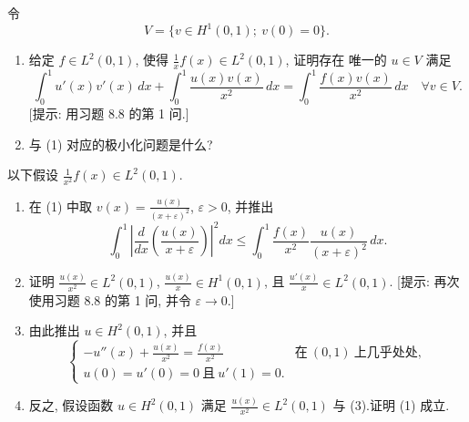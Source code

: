 \begin{exercise}
\label{exer:8.20}
令
\begin{equation*}
V=\{v\in H^1(0,1);\ v(0)=0\}.
\end{equation*}
\begin{enumerate}[label=\arabic*., leftmargin=2.2em, itemsep=0.3em]
	\item 给定 $f\in L^2(0,1)$, 使得 $\frac1xf(x)\in L^2(0,1)$, 证明存在
	      唯一的 $u\in V$ 满足
	      \begin{equation}
	      \int_0^1u'(x)v'(x)\,dx+\int_0^1\frac{u(x)v(x)}{x^2}\,dx
	      =\int_0^1\frac{f(x)v(x)}{x^2}\,dx\quad\forall v\in V.
	      \tag{1}
	      \end{equation}
	      [提示: 用习题 8.8 的第 1 问.]
	\item 与 (1) 对应的极小化问题是什么?
\end{enumerate}
以下假设 $\frac{1}{x^2}f(x)\in L^2(0,1)$.
\begin{enumerate}[label=\arabic*., leftmargin=2.2em, itemsep=0.3em, start=3]
	\item 在 (1) 中取 $v(x)=\frac{u(x)}{(x+\varepsilon)^2}$, $\varepsilon>0$,
	      并推出
	      \begin{equation}
	      \int_0^1\left|\frac{d}{dx}\left(\frac{u(x)}{x+\varepsilon}\right)
	      \right|^2dx\le\int_0^1\frac{f(x)}{x^2}\frac{u(x)}{(x+\varepsilon)^2}\,dx.
	      \tag{2}
	      \end{equation}
	\item 证明 $\frac{u(x)}{x^2}\in L^2(0,1)$,
	      $\frac{u(x)}{x}\in H^1(0,1)$, 且 $\frac{u'(x)}{x}\in L^2(0,1)$.
	      [提示: 再次使用习题 8.8 的第 1 问, 并令 $\varepsilon\to0$.]
	\item 由此推出 $u\in H^2(0,1)$, 并且
	      \begin{equation}
	      \begin{cases}
	      -u''(x)+\frac{u(x)}{x^2}=\frac{f(x)}{x^2} & \text{在}\ (0,1)\ \text{上几乎处处},\\
	      u(0)=u'(0)=0\ \text{且}\ u'(1)=0.
	      \end{cases}
	      \tag{3}
	      \end{equation}
	\item 反之, 假设函数 $u\in H^2(0,1)$ 满足
	      $\frac{u(x)}{x^2}\in L^2(0,1)$ 与 (3).证明 (1) 成立.
\end{enumerate}
\end{exercise}

